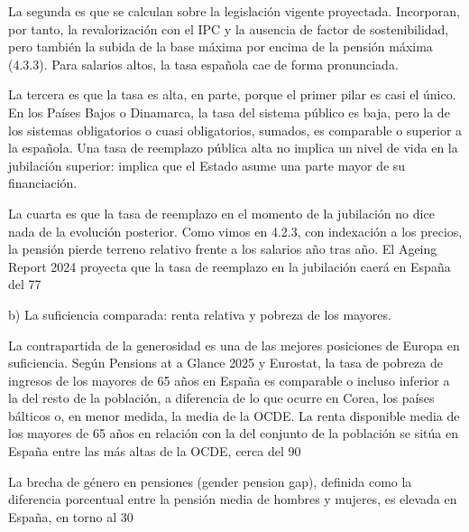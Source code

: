 \documentclass[10pt,a4paper]{article}
\begin{document}
La segunda es que se calculan sobre la legislación vigente proyectada. Incorporan, por tanto, la revalorización con el IPC y la ausencia de factor de sostenibilidad, pero también la subida de la base máxima por encima de la pensión máxima (4.3.3). Para salarios altos, la tasa española cae de forma pronunciada.

La tercera es que la tasa es alta, en parte, porque el primer pilar es casi el único. En los Países Bajos o Dinamarca, la tasa del sistema público es baja, pero la de los sistemas obligatorios o cuasi obligatorios, sumados, es comparable o superior a la española. Una tasa de reemplazo pública alta no implica un nivel de vida en la jubilación superior: implica que el Estado asume una parte mayor de su financiación.

La cuarta es que la tasa de reemplazo en el momento de la jubilación no dice nada de la evolución posterior. Como vimos en 4.2.3, con indexación a los precios, la pensión pierde terreno relativo frente a los salarios año tras año. El Ageing Report 2024 proyecta que la tasa de reemplazo en la jubilación caerá en España del 77%

b) La suficiencia comparada: renta relativa y pobreza de los mayores.

La contrapartida de la generosidad es una de las mejores posiciones de Europa en suficiencia. Según Pensions at a Glance 2025 y Eurostat, la tasa de pobreza de ingresos de los mayores de 65 años en España es comparable o incluso inferior a la del resto de la población, a diferencia de lo que ocurre en Corea, los países bálticos o, en menor medida, la media de la OCDE. La renta disponible media de los mayores de 65 años en relación con la del conjunto de la población se sitúa en España entre las más altas de la OCDE, cerca del 90%

La brecha de género en pensiones (gender pension gap), definida como la diferencia porcentual entre la pensión media de hombres y mujeres, es elevada en España, en torno al 30%
\end{document}
